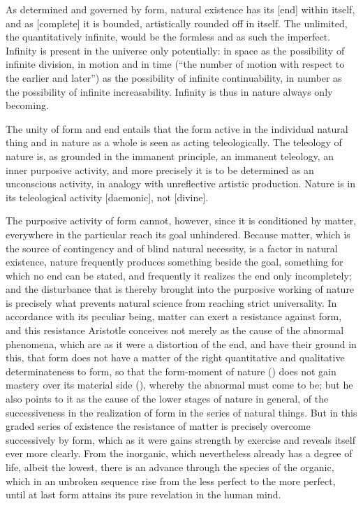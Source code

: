 As determined and governed by form, natural existence has its 
[end] within itself, and as  [complete] it is bounded, artistically
rounded off in itself. The unlimited, the quantitatively infinite, would
be the formless and as such the imperfect. Infinity is present in the
universe only potentially: in space as the possibility of infinite
division, in motion and in time (``the number of motion with respect
to the earlier and later'') as the possibility of infinite
continuability, in number as the possibility of infinite
increasability. Infinity is thus in nature always only becoming.

The unity of form and end entails that the form active in the
individual natural thing and in nature as a whole is seen as acting
teleologically. The teleology of nature is, as grounded in the immanent
principle, an immanent teleology, an inner purposive activity, and more
precisely it is to be determined as an unconscious activity, in analogy
with unreflective artistic production. Nature is in its teleological
activity  [daemonic], not  [divine].

The purposive activity of form cannot, however, since it is conditioned
by matter, everywhere in the particular reach its goal
unhindered. Because matter, which is the source of
contingency and of blind natural necessity, is a factor in natural
existence, nature frequently produces something beside the goal,
something for which no end can be stated, and frequently it realizes
the end only incompletely; and the disturbance that is thereby brought
into the purposive working of nature is precisely what prevents
natural science from reaching strict universality. In accordance with
its peculiar being, matter can exert a resistance against form, and
this resistance Aristotle conceives not merely as the cause of the
abnormal phenomena, which are as it were a distortion of the end, and
have their ground in this, that form does not have a matter of the
right quantitative and qualitative determinateness to form, so that the
form-moment of nature () does not gain mastery over its material
side (), whereby the abnormal must come to be; but he also points
to it as the cause of the lower stages of nature in general, of the
successiveness in the realization of form in the series of natural
things. But in this graded series of existence the resistance of matter
is precisely overcome successively by form, which as it were gains
strength by exercise and reveals itself ever more clearly. From the
inorganic, which nevertheless already has a degree of life, albeit the
lowest, there is an advance through the species of the organic, which
in an unbroken sequence rise from the less perfect to the more perfect,
until at last form attains its pure revelation in the human mind.

